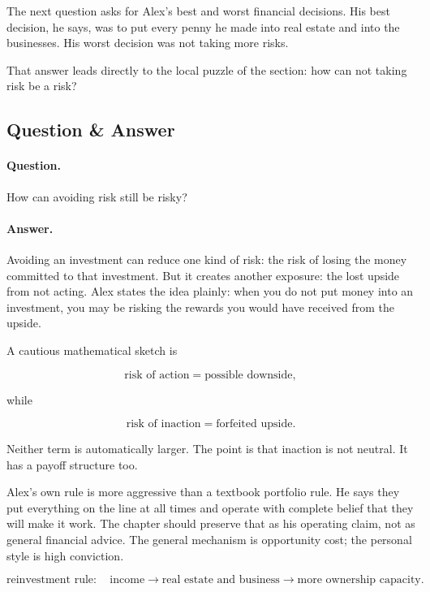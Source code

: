 The next question asks for Alex's best and worst financial decisions. His best decision, he says, was to put every penny he made into real estate and into the businesses. His worst decision was not taking more risks.

That answer leads directly to the local puzzle of the section: how can not taking risk be a risk?

\subsection{Question \& Answer}

\paragraph{Question.}
How can avoiding risk still be risky?

\paragraph{Answer.}
Avoiding an investment can reduce one kind of risk: the risk of losing the money committed to that investment. But it creates another exposure: the lost upside from not acting. Alex states the idea plainly: when you do not put money into an investment, you may be risking the rewards you would have received from the upside.

A cautious mathematical sketch is

\begin{equation}
\text{risk of action}
=
\text{possible downside},
\end{equation}

while

\begin{equation}
\text{risk of inaction}
=
\text{forfeited upside}.
\end{equation}

Neither term is automatically larger. The point is that inaction is not neutral. It has a payoff structure too.

Alex's own rule is more aggressive than a textbook portfolio rule. He says they put everything on the line at all times and operate with complete belief that they will make it work. The chapter should preserve that as his operating claim, not as general financial advice. The general mechanism is opportunity cost; the personal style is high conviction.

\begin{equation}
\text{reinvestment rule}
:
\quad
\text{income}
\longrightarrow
\text{real estate and business}
\longrightarrow
\text{more ownership capacity}.
\end{equation}

